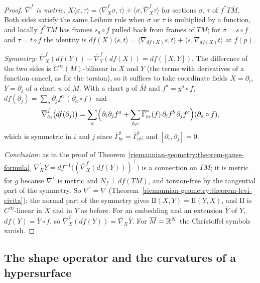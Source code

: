 \begin{proof}
\emph{$\overline{\nabla}^f$ is metric:} $X\langle\sigma, \tau\rangle = \langle\overline{\nabla}^f_X\sigma, \tau\rangle + \langle\sigma, \overline{\nabla}^f_X\tau\rangle$ for sections
$\sigma$, $\tau$ of $f^*T\overline{M}$. Both sides satisfy the same Leibniz rule when $\sigma$ or $\tau$ is multiplied by a function, and locally $f^*T\overline{M}$ has frames
$s_a \circ f$ pulled back from frames of $T\overline{M}$; for $\sigma = s \circ f$ and $\tau = t \circ f$ the identity is
$df(X)\langle s, t\rangle = \langle\overline{\nabla}_{df(X)}s, t\rangle + \langle s, \overline{\nabla}_{df(X)}t\rangle$ at $f(p)$.

\emph{Symmetry:} $\overline{\nabla}^f_X(df(Y)) - \overline{\nabla}^f_Y(df(X)) = df([X, Y])$. The difference of the two sides is $C^\infty(M)$-bilinear in $X$ and $Y$ (the terms with
derivatives of a function cancel, as for the torsion), so it suffices to take coordinate fields $X = \partial_i$, $Y = \partial_j$ of a chart $u$ of $M$. With a chart $y$ of
$\overline{M}$ and $f^a = y^a \circ f$, $df(\partial_j) = \sum_a\partial_jf^a\,(\partial_a \circ f)$ and
\[
\overline{\nabla}^f_{\partial_i}\bigl(df(\partial_j)\bigr) = \sum_a\Bigl(\partial_i\partial_jf^a + \sum_{b,c}\overline{\Gamma}^a_{bc}(f)\,\partial_if^b\,\partial_jf^c\Bigr)(\partial_a \circ f),
\]
which is symmetric in $i$ and $j$ since $\overline{\Gamma}^a_{bc} = \overline{\Gamma}^a_{cb}$; and $[\partial_i, \partial_j] = 0$.

\emph{Conclusion:} as in the proof of Theorem~\ref{riemannian-geometry:theorem-gauss-formula}, $\nabla^{\prime}_XY = df^{-1}\bigl((\overline{\nabla}^f_X(df(Y)))^\top\bigr)$ is a connection
on $TM$; it is metric for $g$ because $\overline{\nabla}^f$ is metric and $N_f \perp df(TM)$, and torsion-free by the tangential part of the symmetry. So $\nabla^{\prime} = \nabla$
(Theorem~\ref{riemannian-geometry:theorem-levi-civita}); the normal part of the symmetry gives $\mathrm{II}(X, Y) = \mathrm{II}(Y, X)$, and $\mathrm{II}$ is $C^\infty$-linear in $X$ and
in $Y$ as before. For an embedding and an extension $\overline{Y}$ of $Y$, $df(Y) = \overline{Y} \circ f$, so $\overline{\nabla}^f_X(df(Y)) = \overline{\nabla}_X\overline{Y}$. For
$\overline{M} = \mathbb{R}^N$ the Christoffel symbols vanish.
\end{proof}

\subsection{The shape operator and the curvatures of a hypersurface}\label{riemannian-geometry:subsection-shape-operator}


